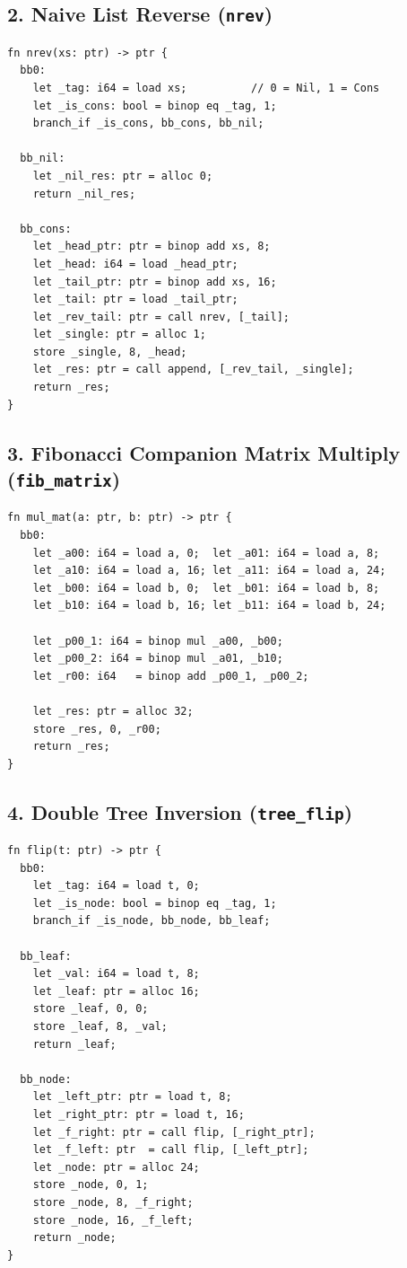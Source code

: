 \subsection{2. Naive List Reverse (\texttt{nrev})}
\begin{lstlisting}[caption={SSA MIR for Recursive \texttt{nrev}.}]
fn nrev(xs: ptr) -> ptr {
  bb0:
    let _tag: i64 = load xs;          // 0 = Nil, 1 = Cons
    let _is_cons: bool = binop eq _tag, 1;
    branch_if _is_cons, bb_cons, bb_nil;

  bb_nil:
    let _nil_res: ptr = alloc 0;
    return _nil_res;

  bb_cons:
    let _head_ptr: ptr = binop add xs, 8;
    let _head: i64 = load _head_ptr;
    let _tail_ptr: ptr = binop add xs, 16;
    let _tail: ptr = load _tail_ptr;
    let _rev_tail: ptr = call nrev, [_tail];
    let _single: ptr = alloc 1;
    store _single, 8, _head;
    let _res: ptr = call append, [_rev_tail, _single];
    return _res;
}
\end{lstlisting}

\subsection{3. Fibonacci Companion Matrix Multiply (\texttt{fib\_matrix})}
\begin{lstlisting}[caption={SSA MIR for \texttt{fib\_matrix}.}]
fn mul_mat(a: ptr, b: ptr) -> ptr {
  bb0:
    let _a00: i64 = load a, 0;  let _a01: i64 = load a, 8;
    let _a10: i64 = load a, 16; let _a11: i64 = load a, 24;
    let _b00: i64 = load b, 0;  let _b01: i64 = load b, 8;
    let _b10: i64 = load b, 16; let _b11: i64 = load b, 24;
    
    let _p00_1: i64 = binop mul _a00, _b00;
    let _p00_2: i64 = binop mul _a01, _b10;
    let _r00: i64   = binop add _p00_1, _p00_2;
    
    let _res: ptr = alloc 32;
    store _res, 0, _r00;
    return _res;
}
\end{lstlisting}

\subsection{4. Double Tree Inversion (\texttt{tree\_flip})}
\begin{lstlisting}[caption={SSA MIR for \texttt{tree\_flip}.}]
fn flip(t: ptr) -> ptr {
  bb0:
    let _tag: i64 = load t, 0;
    let _is_node: bool = binop eq _tag, 1;
    branch_if _is_node, bb_node, bb_leaf;

  bb_leaf:
    let _val: i64 = load t, 8;
    let _leaf: ptr = alloc 16;
    store _leaf, 0, 0;
    store _leaf, 8, _val;
    return _leaf;

  bb_node:
    let _left_ptr: ptr = load t, 8;
    let _right_ptr: ptr = load t, 16;
    let _f_right: ptr = call flip, [_right_ptr];
    let _f_left: ptr  = call flip, [_left_ptr];
    let _node: ptr = alloc 24;
    store _node, 0, 1;
    store _node, 8, _f_right;
    store _node, 16, _f_left;
    return _node;
}
\end{lstlisting}

